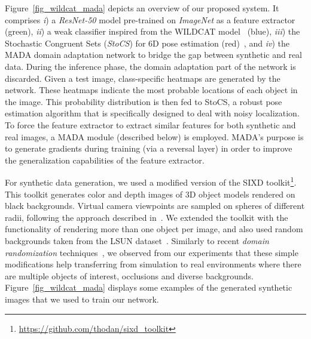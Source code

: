 \documentclass[letterpaper, 10 pt, conference]{ieeeconf}  %
\newcommand{\phil}[1]{\textcolor{blue}{#1}}
\begin{document}
Figure~\ref{fig_wildcat_mada} depicts an overview of our proposed system. It comprises {\it i}) a {\it ResNet-50} model pre-trained on {\it ImageNet} as a feature extractor (green), {\it ii}) a weak classifier inspired from the WILDCAT model~\cite{durand2017wildcat} (blue), {\it iii}) the Stochastic Congruent Sets ({\it StoCS}) for 6D pose estimation (red)~\cite{mitash2018robust}, and {\it iv}) the MADA domain adaptation network to bridge the gap between synthetic and real data. %
During the inference phase, the domain adaptation part of the network is discarded. Given a test image, class-specific heatmaps are generated by the network. These heatmaps indicate the most probable locations of each object in the image. This probability distribution is then fed to StoCS, a robust pose estimation algorithm that is specifically designed to deal with noisy localization.
To force the feature extractor to extract similar features for both synthetic and real images, a MADA module (described below) is employed.
MADA's purpose is to generate gradients during training (via a reversal layer) in order to improve the generalization capabilities of the feature extractor.

For synthetic data generation, we used a modified version of the SIXD toolkit\footnote{\url{https://github.com/thodan/sixd_toolkit}}. This toolkit generates color and depth images of 3D object models rendered on black backgrounds. Virtual camera viewpoints are sampled on spheres of different radii, following the approach described in~\cite{hinterstoisser2008simultaneous}. We extended the toolkit with the functionality of rendering more than one object per image, and also used random backgrounds taken from the LSUN dataset~\cite{YuZSSX15}. %
Similarly to recent {\it domain randomization} techniques~\cite{DBLP:conf/iros/TobinFRSZA17}, we observed from our experiments that these simple modifications help transferring from simulation to real environments where there are multiple objects of interest, occlusions and diverse backgrounds. Figure~\ref{fig_wildcat_mada} displays some examples of the generated synthetic images that we used to train our network.
\end{document}
